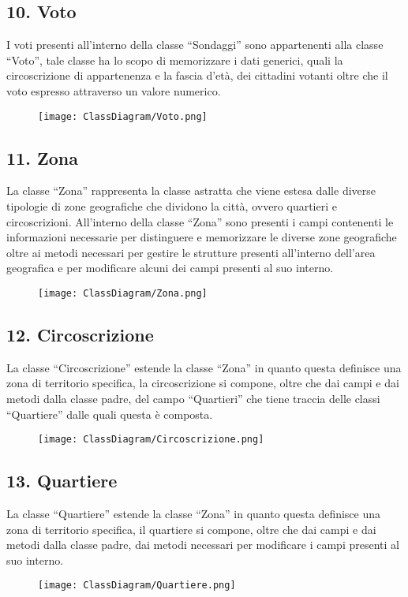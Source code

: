     \subsection*{10. Voto}
        I voti presenti all'interno della classe ``Sondaggi'' sono appartenenti alla classe ``Voto'', tale classe ha lo scopo di memorizzare i dati generici, quali la circoscrizione di appartenenza e la fascia d'età, dei cittadini votanti oltre che il voto espresso attraverso un valore numerico.
        \begin{figure}[H]
            \texttt{[image: ClassDiagram/Voto.png]}
        \end{figure}

    \subsection*{11. Zona}
        La classe ``Zona'' rappresenta la classe astratta che viene estesa dalle diverse tipologie di zone geografiche che dividono la città, ovvero quartieri e circoscrizioni. All'interno della classe ``Zona'' sono presenti i campi contenenti le informazioni necessarie per distinguere e memorizzare le diverse zone geografiche oltre ai metodi necessari per gestire le strutture presenti all'interno dell'area geografica e per modificare alcuni dei campi presenti al suo interno.
        \begin{figure}[H]
            \texttt{[image: ClassDiagram/Zona.png]}
        \end{figure}

    \subsection*{12. Circoscrizione}
        La classe ``Circoscrizione'' estende la classe ``Zona'' in quanto questa definisce una zona di territorio specifica, la circoscrizione si compone, oltre che dai campi e dai metodi dalla classe padre, del campo ``Quartieri'' che tiene traccia delle classi ``Quartiere'' dalle quali questa è composta.
        \begin{figure}[H]
            \texttt{[image: ClassDiagram/Circoscrizione.png]}
        \end{figure}
    
    \subsection*{13. Quartiere}
        La classe ``Quartiere'' estende la classe ``Zona'' in quanto questa definisce una zona di territorio specifica, il quartiere si compone, oltre che dai campi e dai metodi dalla classe padre, dai metodi necessari per modificare i campi presenti al suo interno.
        \begin{figure}[H]
            \texttt{[image: ClassDiagram/Quartiere.png]}
        \end{figure}
    
